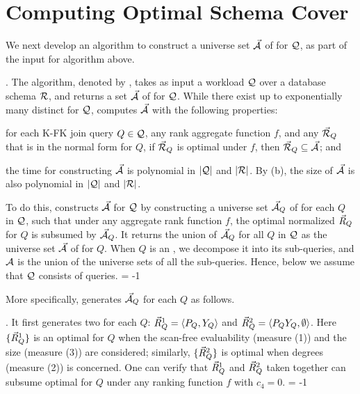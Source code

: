 \vspace{-0.3ex}
\section{Computing Optimal Schema Cover}
\label{sec-cover}
\vspace{-0.4ex}

We next develop an algorithm to construct a universe set
$\vec{{\mathcal A}}$ of \bss for $\mathcal Q$, as part of the input for algorithm
\opts above. %

. The algorithm, denoted by \usc, takes as input a workload $\mathcal Q$
over a database schema ${\mathcal R}$, and returns a set $\vec{{\mathcal A}}$ of \bss
for $\mathcal Q$.
While there exist up to exponentially many distinct \bss for
$\mathcal Q$, \usc computes $\vec{{\mathcal A}}$ with the following properties:
\bi
\item[(a)] for each K-FK join \SPC query $Q\in \mathcal Q$, any rank aggregate function $f$,
  and any \bds $\vec{{\mathcal R}}_{Q}$ that is in the normal form for $Q$,
  if $\vec{{\mathcal R}}_{Q}$ is optimal under $f$, then
  $\vec{{\mathcal R}}_{Q}\subseteq \vec{{\mathcal A}}$; and
\item[(b)] the time for constructing $\vec{{\mathcal A}}$ is polynomial in
  $|\mathcal Q|$ and $|{\mathcal R}|$.
\ei
By (b), the size of $\vec{{\mathcal A}}$ is also polynomial in
$|\mathcal Q|$ and $|{\mathcal R}|$.

To do this, \usc constructs $\vec{{\mathcal A}}$ for $\mathcal Q$ by
constructing a universe set $\vec{{\mathcal A}}_{Q}$ of \bss for each
$Q$ in $\mathcal Q$,
such that under any aggregate rank function $f$, the optimal
normalized \bds $\vec{R}_{Q}$ for $Q$ is %
subsumed by $\vec{{\mathcal A}}_{Q}$.
It returns the union of $\vec{{\mathcal A}}_{Q}$ for all $Q$ in $\mathcal Q$ as
the universe set $\vec{{\mathcal A}}$ of \bss for $Q$.
%
When $Q$ is an \SQL, we decompose it into its \SPC
sub-queries, and ${\mathsf{{\mathcal A}}}$ is the union of the universe sets of
  all the sub-queries.
Hence, below we assume that $\mathcal Q$ consists of \SPC queries.
\looseness = -1

More specifically, \usc generates $\vec{{\mathcal A}}_{Q}$ for each $Q$ as follows.

. It first generates two \bss for each $Q$:
$\vec{R}_{Q}^{1} = \langle P_{Q},\allowbreak Y_{Q}\rangle$ and $\vec{R}_{Q}^{2} =
\langle P_{Q}Y_{Q},\allowbreak \emptyset\rangle$. Here $\{\vec{R}_{Q}^{1}\}$ is
an optimal \bds for $Q$ when the scan-free evaluability (measure
(1))
and the size (measure (3)) are considered; similarly,
$\{\vec{R}_{Q}^{2}\}$ is optimal when degrees (measure (2)) is
concerned.
One can verify that $\vec{R}_{Q}^{1}$ and $\vec{R}_{Q}^{2}$ taken
together can subsume optimal \bdss for $Q$ under any ranking
function $f$ with $c_{4} = 0$.
\looseness = -1

